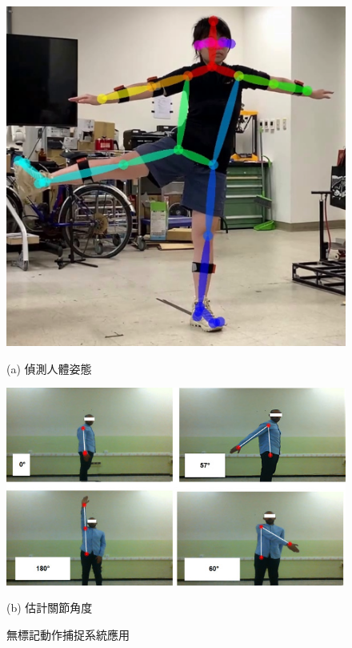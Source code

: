 \begin{figure}[!ht]
    \centering
    \begin{minipage}{.37\textwidth}
      \centering
      \includegraphics[width=.95\linewidth]{figure/ch2_fig_rec_openpose.png}
      \caption*{(a) 偵測人體姿態}
    \end{minipage}%
    \begin{minipage}{.63\textwidth}
       \centering
       \includegraphics[width=.95\linewidth]{figure/ch2_fig_joint_angle.jpg}
       \caption*{(b) 估計關節角度~\cite{LATRECHE2023112826}}
    \end{minipage}
    \caption[無標記動作捕捉系統應用]{無標記動作捕捉系統應用}
    \label{ch2_fig_rec_result}
\end{figure}

